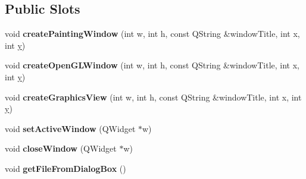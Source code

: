 \subsection*{Public Slots}
\begin{DoxyCompactItemize}
\item 
\hypertarget{class_d_o_1_1_graphics_application_a91ede8552c45e54ff580346a1facd3e1}{void {\bfseries create\-Painting\-Window} (int w, int h, const Q\-String \&window\-Title, int x, int \hyperlink{group___channel_accessors_gac90c52c5b3a7b2a7e3761e6e84f25778}{y})}\label{class_d_o_1_1_graphics_application_a91ede8552c45e54ff580346a1facd3e1}

\item 
\hypertarget{class_d_o_1_1_graphics_application_abf7475aa077a1f00ac79d6d91870c605}{void {\bfseries create\-Open\-G\-L\-Window} (int w, int h, const Q\-String \&window\-Title, int x, int \hyperlink{group___channel_accessors_gac90c52c5b3a7b2a7e3761e6e84f25778}{y})}\label{class_d_o_1_1_graphics_application_abf7475aa077a1f00ac79d6d91870c605}

\item 
\hypertarget{class_d_o_1_1_graphics_application_a8e47c553a48b897d1a3c084808ec5cd4}{void {\bfseries create\-Graphics\-View} (int w, int h, const Q\-String \&window\-Title, int x, int \hyperlink{group___channel_accessors_gac90c52c5b3a7b2a7e3761e6e84f25778}{y})}\label{class_d_o_1_1_graphics_application_a8e47c553a48b897d1a3c084808ec5cd4}

\item 
\hypertarget{class_d_o_1_1_graphics_application_a80b900f921a02a88bc75f722495c5fa1}{void {\bfseries set\-Active\-Window} (Q\-Widget $\ast$w)}\label{class_d_o_1_1_graphics_application_a80b900f921a02a88bc75f722495c5fa1}

\item 
\hypertarget{class_d_o_1_1_graphics_application_ade0128cbcddef1b8a1911fc6019f9377}{void {\bfseries close\-Window} (Q\-Widget $\ast$w)}\label{class_d_o_1_1_graphics_application_ade0128cbcddef1b8a1911fc6019f9377}

\item 
\hypertarget{class_d_o_1_1_graphics_application_aeb7aedaa0751a70e7328c2f742b2686c}{void {\bfseries get\-File\-From\-Dialog\-Box} ()}\label{class_d_o_1_1_graphics_application_aeb7aedaa0751a70e7328c2f742b2686c}

\end{DoxyCompactItemize}
